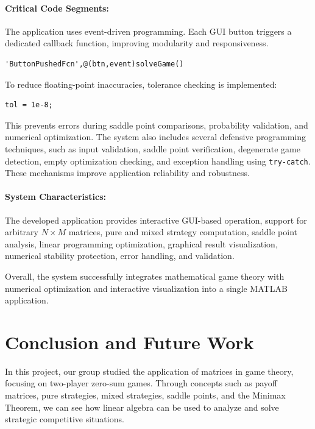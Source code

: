 \documentclass[12pt,a4paper]{article}
\begin{document}
\paragraph{Critical Code Segments:}

The application uses event-driven programming. Each GUI button triggers a dedicated callback function, improving modularity and responsiveness.

\begin{lstlisting}[style=code]
'ButtonPushedFcn',@(btn,event)solveGame()
\end{lstlisting}

To reduce floating-point inaccuracies, tolerance checking is implemented:

\begin{lstlisting}[style=code]
tol = 1e-8;
\end{lstlisting}

This prevents errors during saddle point comparisons, probability validation, and numerical optimization. The system also includes several defensive programming techniques, such as input validation, saddle point verification, degenerate game detection, empty optimization checking, and exception handling using \texttt{try-catch}. These mechanisms improve application reliability and robustness.

\paragraph{System Characteristics:}

The developed application provides interactive GUI-based operation, support for arbitrary \(N \times M\) matrices, pure and mixed strategy computation, saddle point analysis, linear programming optimization, graphical result visualization, numerical stability protection, error handling, and validation.

Overall, the system successfully integrates mathematical game theory with numerical optimization and interactive visualization into a single MATLAB application.

\newpage
\section{Conclusion and Future Work}

In this project, our group studied the application of matrices in game theory, focusing on two-player zero-sum games. Through concepts such as payoff matrices, pure strategies, mixed strategies, saddle points, and the Minimax Theorem, we can see how linear algebra can be used to analyze and solve strategic competitive situations.
\end{document}
